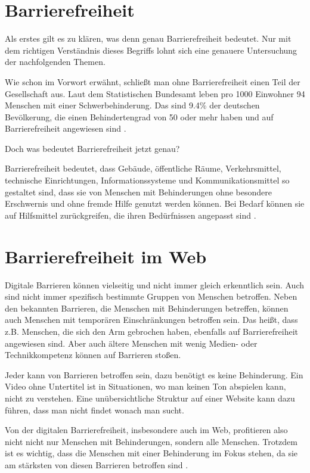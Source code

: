 \section{Barrierefreiheit}
Als erstes gilt es zu klären, was denn genau Barrierefreiheit bedeutet. Nur mit dem richtigen Verständnis dieses Begriffs lohnt sich eine genauere Untersuchung der nachfolgenden Themen.

Wie schon im Vorwort erwähnt, schließt man ohne Barrierefreiheit einen Teil der Gesellschaft aus. Laut dem Statistischen Bundesamt leben pro 1000 Einwohner 94 Menschen mit einer Schwerbehinderung. Das sind 9.4\% der deutschen Bevölkerung, die einen Behindertengrad von 50 oder mehr haben und auf Barrierefreiheit angewiesen sind \parencite[vgl.][]{destatis_schwerbehinderte_2021}.

Doch was bedeutet Barrierefreiheit jetzt genau? 

Barrierefreiheit bedeutet, dass Gebäude, öffentliche Räume, Verkehrsmittel, technische Einrichtungen, Informationssysteme und Kommunikationsmittel so gestaltet sind, dass sie von Menschen mit Behinderungen ohne besondere Erschwernis und ohne fremde Hilfe genutzt werden können. Bei Bedarf können sie auf Hilfsmittel zurückgreifen, die ihren Bedürfnissen angepasst sind \parencite[vgl.][]{bfj_bgg4_2022}.

\section{Barrierefreiheit im Web}
Digitale Barrieren können vielseitig und nicht immer gleich erkenntlich sein. Auch sind nicht immer spezifisch bestimmte Gruppen von Menschen betroffen. Neben den bekannten Barrieren, die Menschen mit Behinderungen betreffen, können auch Menschen mit temporären Einschränkungen betroffen sein. Das heißt, dass z.B. Menschen, die sich den Arm gebrochen haben, ebenfalls auf Barrierefreiheit angewiesen sind. Aber auch ältere Menschen mit wenig Medien- oder Technikkompetenz können auf Barrieren stoßen.

Jeder kann von Barrieren betroffen sein, dazu benötigt es keine Behinderung. Ein Video ohne Untertitel ist in Situationen, wo man keinen Ton abspielen kann, nicht zu verstehen. Eine unübersichtliche Struktur auf einer Website kann dazu führen, dass man nicht findet wonach man sucht. 

Von der digitalen Barrierefreiheit, insbesondere auch im Web, profitieren also nicht nicht nur Menschen mit Behinderungen, sondern alle Menschen. Trotzdem ist es wichtig, dass die Menschen mit einer Behinderung im Fokus stehen, da sie am stärksten von diesen Barrieren betroffen sind \parencite[vgl.][]{bbi_digitale-barrierefreiheit_2025}.

